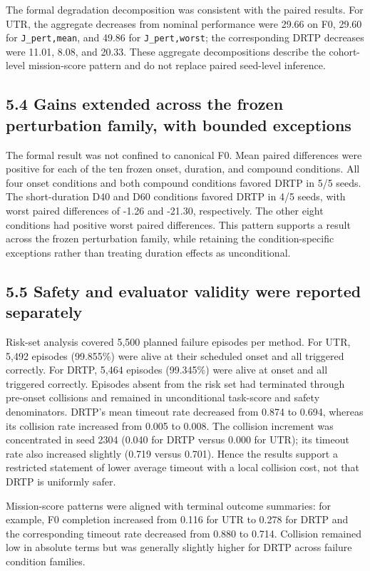The formal degradation decomposition was consistent with the paired results. For UTR, the aggregate decreases from nominal performance were 29.66 on F0, 29.60 for \texttt{J_pert,mean}, and 49.86 for \texttt{J_pert,worst}; the corresponding DRTP decreases were 11.01, 8.08, and 20.33. These aggregate decompositions describe the cohort-level mission-score pattern and do not replace paired seed-level inference.

\subsection{5.4 Gains extended across the frozen perturbation family, with bounded exceptions}

The formal result was not confined to canonical F0. Mean paired differences were positive for each of the ten frozen onset, duration, and compound conditions. All four onset conditions and both compound conditions favored DRTP in 5/5 seeds. The short-duration D40 and D60 conditions favored DRTP in 4/5 seeds, with worst paired differences of -1.26 and -21.30, respectively. The other eight conditions had positive worst paired differences. This pattern supports a result across the frozen perturbation family, while retaining the condition-specific exceptions rather than treating duration effects as unconditional.

\subsection{5.5 Safety and evaluator validity were reported separately}

Risk-set analysis covered 5,500 planned failure episodes per method. For UTR, 5,492 episodes (99.855\%) were alive at their scheduled onset and all triggered correctly. For DRTP, 5,464 episodes (99.345\%) were alive at onset and all triggered correctly. Episodes absent from the risk set had terminated through pre-onset collisions and remained in unconditional task-score and safety denominators. DRTP's mean timeout rate decreased from 0.874 to 0.694, whereas its collision rate increased from 0.005 to 0.008. The collision increment was concentrated in seed 2304 (0.040 for DRTP versus 0.000 for UTR); its timeout rate also increased slightly (0.719 versus 0.701). Hence the results support a restricted statement of lower average timeout with a local collision cost, not that DRTP is uniformly safer.

Mission-score patterns were aligned with terminal outcome summaries: for example, F0 completion increased from 0.116 for UTR to 0.278 for DRTP and the corresponding timeout rate decreased from 0.880 to 0.714. Collision remained low in absolute terms but was generally slightly higher for DRTP across failure condition families.

